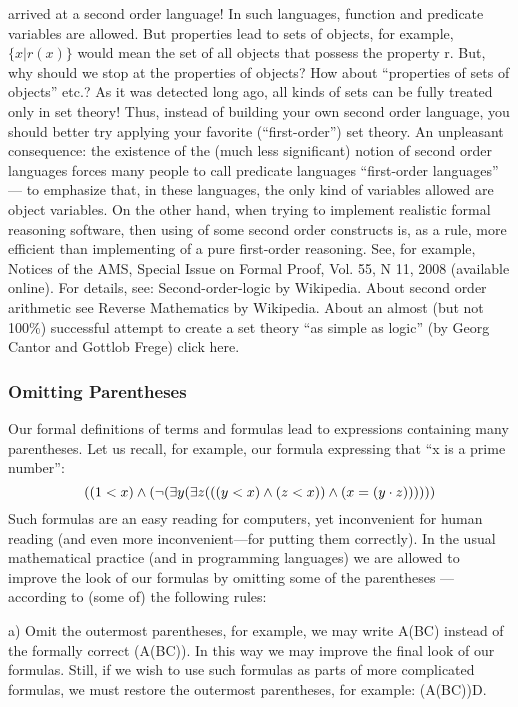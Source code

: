 arrived at a second order language! In such languages, function and predicate variables are allowed. But properties lead to
sets of objects, for example, \(\{x | r(x)\}\) would mean the set of all objects that possess the property r. But, why should we stop at
the properties of objects? How about ``properties of sets of objects'' etc.? As it was detected long ago, all kinds of sets can be
fully treated only in set theory! Thus, instead of building your own second order language, you should better try applying your
favorite (``first-order'') set theory. An unpleasant consequence: the existence of the (much less significant) notion of second
order languages forces many people to call predicate languages ``first-order languages'' --- to emphasize that, in these
languages, the only kind of variables allowed are object variables.
On the other hand, when trying to implement realistic formal reasoning software, then using of some second order constructs
is, as a rule, more efficient than implementing of a pure first-order reasoning. See, for example, Notices of the AMS, Special
Issue on Formal Proof, Vol. 55, N 11, 2008 (available online).
For details, see: Second-order-logic by Wikipedia. About second order arithmetic see Reverse Mathematics by Wikipedia.
About an almost (but not 100\%) successful attempt to create a set theory ``as simple as logic'' (by Georg Cantor and Gottlob
Frege) click here.

\subsubsection*{Omitting Parentheses}

Our formal definitions of terms and formulas lead to expressions containing many parentheses. Let us recall, for example, our formula expressing that ``x is a prime number'':
\[
((1<x)\wedge (\neg (\exists y(\exists z(((y<x)\wedge (z<x))\wedge (x=(y\cdot z))))))
\]
Such formulas are an easy reading for computers, yet inconvenient for human reading (and even more inconvenient---for putting them correctly). In the usual mathematical practice (and in programming languages) we are allowed to improve the look of our formulas by omitting some of the parentheses --- according to (some of) the following rules:

a) Omit the outermost parentheses, for example, we may write A\IMPLIES (B\IMPLIES C) instead of the formally correct (A\IMPLIES (B\IMPLIES C)). In this way we may improve the final look of our formulas. Still, if we wish to use such formulas as parts of more complicated formulas, we must restore the outermost parentheses, for example: (A\IMPLIES (B\IMPLIES C))\IMPLIES D.

